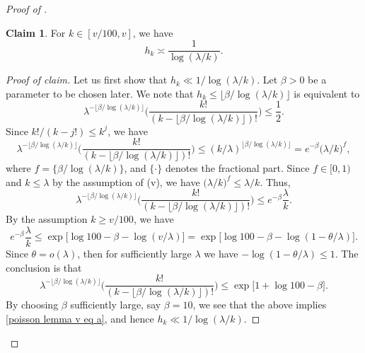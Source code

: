 \documentclass{amsart}
\theoremstyle{definition}
\newtheorem*{claim}{Claim}
\numberwithin{equation}{section}
\begin{document}
\begin{proof}[Proof of ]
	\begin{claim} For $k \in [v/100,v]$, we have
		\begin{equation}\label{hv closed form}
			h_k \asymp \frac{1}{\log(\lambda/k)}.
		\end{equation}
	\end{claim}
	\begin{proof}[Proof of claim]
		Let us first show that $h_k \ll 1/\log(\lambda/k)$. Let $\beta > 0$ be a parameter to be chosen later. We note that $h_k \leq \lfloor \beta/ \log (\lambda/k) \rfloor$ is equivalent to 
		\begin{equation}\label{poisson lemma v eq a}
			\lambda^{-\lfloor \beta/ \log (\lambda/k) \rfloor} \bigg(\frac{k!}{(k-\lfloor \beta/ \log (\lambda/k) \rfloor)!}\bigg) \leq \frac{1}{2}.
		\end{equation}
		Since $k!/(k-j!) \leq k^j$, we have 
		$$ \lambda^{-\lfloor \beta/ \log (\lambda/k) \rfloor} \bigg(\frac{k!}{(k-\lfloor \beta/ \log (\lambda/k) \rfloor)!}\bigg) \leq (k/\lambda)^{\lfloor \beta/ \log (\lambda/k) \rfloor} = e^{-\beta} \big(\lambda/k \big)^{f}, $$
		where $f = \{\beta/ \log (\lambda/k)\}$, and $\{\cdot\}$ denotes the fractional part. Since $f \in [0,1)$ and $k \leq \lambda$ by the assumption of (v), we have $\big(\lambda/k\big)^{f} \leq \lambda/k$. Thus,
		$$ \lambda^{-\lfloor \beta/ \log (\lambda/k) \rfloor} \bigg(\frac{k!}{(k-\lfloor \beta/ \log (\lambda/k) \rfloor)!}\bigg) \leq e^{-\beta} \frac{\lambda}{k}. $$
		By the assumption $k \geq v/100$, we have
		$$ e^{-\beta}\frac{\lambda}{k} \leq \exp\big[\log 100-\beta - \log(v/\lambda)\big] = \exp\big[\log 100 - \beta - \log(1-\theta/\lambda)\big]. $$
		Since $\theta = o(\lambda)$, then for sufficiently large $\lambda$ we have $- \log(1-\theta/\lambda) \leq 1$. The conclusion is that
		$$ \lambda^{-\lfloor \beta/ \log (\lambda/k) \rfloor} \bigg(\frac{k!}{(k-\lfloor \beta/ \log (\lambda/k) \rfloor)!}\bigg) \leq \exp\big[1+\log 100-\beta\big]. $$
		By choosing $\beta$ sufficiently large, say $\beta = 10$, we see that the above implies \eqref{poisson lemma v eq a}, and hence $h_k \ll 1/\log(\lambda/k)$. 
		

\end{proof}
\end{proof}
\end{document}
